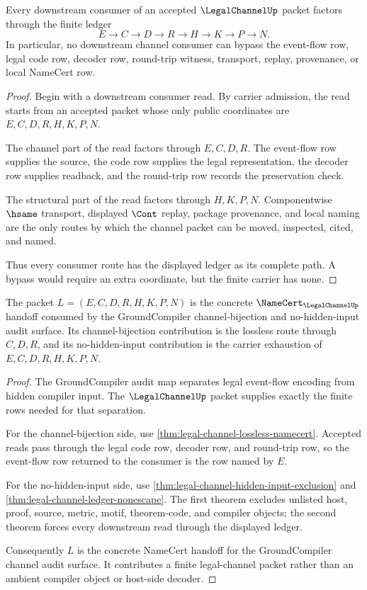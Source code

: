 \begin{theorem}
\label{thm:legal-channel-ledger-nonescape}
Every downstream consumer of an accepted $\LegalChannelUp$ packet factors through the finite ledger
$$
E \to C \to D \to R \to H \to K \to P \to N.
$$
In particular, no downstream channel consumer can bypass the event-flow row, legal code row, decoder row, round-trip witness, transport, replay, provenance, or local NameCert row.
\end{theorem}
\begin{proof}
Begin with a downstream consumer read. By carrier admission, the read starts from an accepted packet whose only public coordinates are $E,C,D,R,H,K,P,N$.

The channel part of the read factors through $E,C,D,R$. The event-flow row supplies the source, the code row supplies the legal representation, the decoder row supplies readback, and the round-trip row records the preservation check.

The structural part of the read factors through $H,K,P,N$. Componentwise $\hsame$ transport, displayed $\Cont$ replay, package provenance, and local naming are the only routes by which the channel packet can be moved, inspected, cited, and named.

Thus every consumer route has the displayed ledger as its complete path. A bypass would require an extra coordinate, but the finite carrier has none.
\end{proof}

\begin{theorem}
\label{thm:legal-channel-groundcompiler-handoff}
The packet $L=(E,C,D,R,H,K,P,N)$ is the concrete $\NameCert_{\LegalChannelUp}$ handoff consumed by the GroundCompiler channel-bijection and no-hidden-input audit surface. Its channel-bijection contribution is the lossless route through $C,D,R$, and its no-hidden-input contribution is the carrier exhaustion of $E,C,D,R,H,K,P,N$.
\end{theorem}
\begin{proof}
The GroundCompiler audit map separates legal event-flow encoding from hidden compiler input. The $\LegalChannelUp$ packet supplies exactly the finite rows needed for that separation.

For the channel-bijection side, use \autoref{thm:legal-channel-lossless-namecert}. Accepted reads pass through the legal code row, decoder row, and round-trip row, so the event-flow row returned to the consumer is the row named by $E$.

For the no-hidden-input side, use \autoref{thm:legal-channel-hidden-input-exclusion} and \autoref{thm:legal-channel-ledger-nonescape}. The first theorem excludes unlisted host, proof, source, metric, motif, theorem-code, and compiler objects; the second theorem forces every downstream read through the displayed ledger.

Consequently $L$ is the concrete NameCert handoff for the GroundCompiler channel audit surface. It contributes a finite legal-channel packet rather than an ambient compiler object or host-side decoder.
\end{proof}

